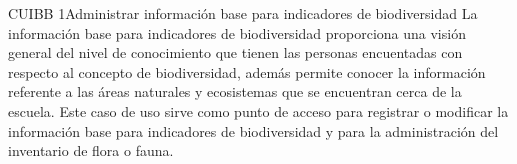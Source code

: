 
\begin{UseCase}{CUIBB 1}{Administrar información base para indicadores de biodiversidad}
    {
	La información base para indicadores de biodiversidad proporciona una visión general del nivel de conocimiento que tienen las personas encuentadas con respecto al concepto de biodiversidad, además permite conocer la información referente a las áreas naturales y ecosistemas que se encuentran cerca de la escuela. Este caso de uso  sirve como punto de acceso para registrar o modificar la información base para indicadores de biodiversidad y para la administración del inventario de flora o fauna.  
    }
    
    


\end{UseCase}
